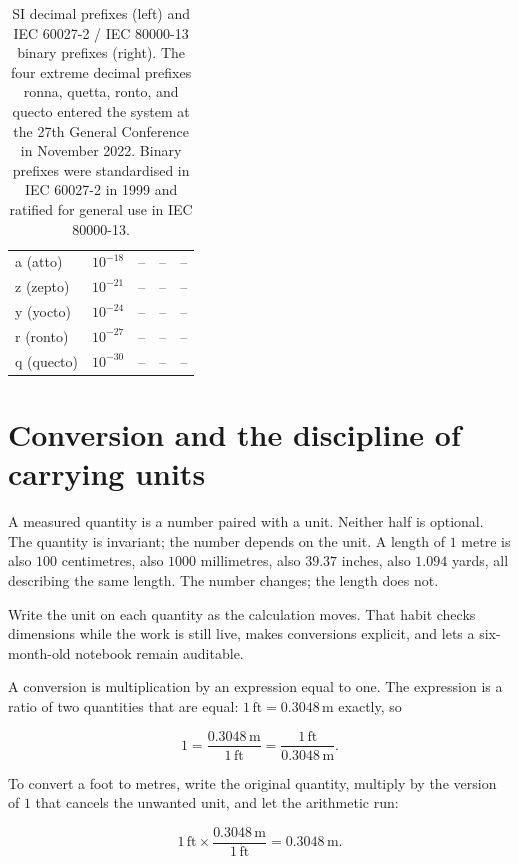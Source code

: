 \begin{table}[h]
\begin{tabular}{lllll}
a (atto)   & $10^{-18}$ & --      & --       & --                \\
z (zepto)  & $10^{-21}$ & --      & --       & --                \\
y (yocto)  & $10^{-24}$ & --      & --       & --                \\
r (ronto)  & $10^{-27}$ & --      & --       & --                \\
q (quecto) & $10^{-30}$ & --      & --       & --                \\
\bottomrule
\end{tabular}
\caption{SI decimal prefixes (left) and IEC 60027-2 / IEC 80000-13
binary prefixes (right). The four extreme decimal prefixes ronna,
quetta, ronto, and quecto entered the system at the 27th General
Conference in November 2022. Binary prefixes were standardised in
IEC 60027-2 in 1999 and ratified for general use in IEC 80000-13.}
\label{tab:vol01:ch02:si-prefixes}
\end{table}

\section{Conversion and the discipline of carrying units}

A measured quantity is a number paired with a unit. Neither half is
optional. The quantity is invariant; the number depends on the unit.
A length of $1$ metre is also $100$ centimetres, also $1000$
millimetres, also $39.37$ inches, also $1.094$ yards, all describing
the same length. The number changes; the length does not.

Write the unit on each quantity as the calculation moves. That habit
checks dimensions while the work is still live, makes conversions
explicit, and lets a six-month-old notebook remain auditable.

A conversion is multiplication by an expression equal to one. The
expression is a ratio of two quantities that are equal: $1\,\text{ft}
= 0.3048 \,\si{\meter}$ exactly, so

\[
1 = \frac{0.3048 \,\si{\meter}}{1 \,\text{ft}} = \frac{1 \,\text{ft}}
{0.3048 \,\si{\meter}}.
\]

To convert a foot to metres, write the original quantity, multiply by
the version of $1$ that cancels the unwanted unit, and let the
arithmetic run:

\[
1 \,\text{ft} \times \frac{0.3048 \,\si{\meter}}{1 \,\text{ft}} =
0.3048 \,\si{\meter}.
\]


